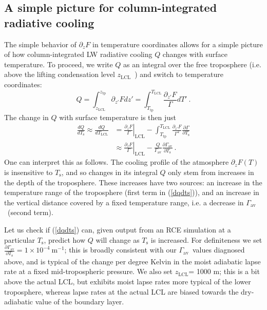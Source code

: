 \documentclass[10pt]{article}
\newcommand{\beqn}{\begin{equation}}
\newcommand{\eeqn}{\end{equation}}
\newcommand{\eqnref}[1]{(\ref{#1})}
\newcommand{\n}{\nonumber}
\newcommand{\inverse}{^{-1}}
\newcommand{\partialderf}[2]{\ensuremath{\frac{\partial #1}{\partial #2}}}
\newcommand{\der}[2]{\ensuremath{\frac{d #1}{d #2}}}
\newcommand{\ppz}{\ensuremath{\partial_z}}
\newcommand{\Ts}{\ensuremath{T_\mathrm{s}}}
\newcommand{\ztp}{\ensuremath{z_\mathrm{tp}}}
\newcommand{\zlcl}{\ensuremath{z_\mathrm{LCL}}}
\newcommand{\Tlcl}{\ensuremath{T_\mathrm{LCL}}}
\newcommand{\Ttp}{\ensuremath{T_\mathrm{tp}}}
\newcommand{\gammaav}{\ensuremath{\Gamma_\mathrm{av}}}
\newcommand{\Kinverse}{\ensuremath{\mathrm{K^{-1}}}}
\begin{document}
	\subsection{A simple picture for column-integrated radiative cooling}
		The simple behavior of $\ppz F$ in temperature coordinates allows for a simple picture of how column-integrated LW radiative cooling $Q$ changes with surface temperature. 
To proceed, we write $Q$ as an integral over the free troposphere (i.e. above the lifting condensation level \zlcl\ ) and switch to temperature coordinates: 
	\beqn
		Q = \int_{\zlcl}^{\ztp} \partial_{z'} F dz'  = \int_{\Ttp}^{\Tlcl} \frac{\partial_{z'} F}{\Gamma} dT' \ . 
		\n
	\eeqn
  The change in $Q$ with surface temperature is then just
	\begin{align}
		\der{Q}{\Ts} \approx \der{Q}{\Tlcl} & =  \left. \frac{\ppz F}{\Gamma}\right |_{\mathrm{LCL}} - \int_{\Ttp}^{\Tlcl}\frac{\partial_{z'} F}{\Gamma^2}\partialderf{\Gamma}{\Ts} \n  \\
				& \approx \left. \frac{\ppz F}{\Gamma}\right |_{\mathrm{LCL}} - \frac{Q}{\gammaav}\partialderf{\gammaav}{\Ts} \ . \label{dqdts}
	\end{align}
One can interpret this as follows. The cooling profile of the atmosphere $\ppz F(T)$ is insensitive to $\Ts$, and so changes in its integral $Q$ only stem from increases in the depth of the troposphere. These increases have two sources: an increase in the temperature range of the troposphere (first term in \eqnref{dqdts}), and an increase in the vertical distance covered by a fixed temperature range, i.e. a decrease in \gammaav\ (second term).

Let us check if \eqnref{dqdts} can, given output from an RCE simulation at a particular \Ts, predict how $Q$ will change as $\Ts$ is increased. 
For definiteness we set $\partialderf{\gammaav}{\Ts}= 1\times 10^{-4} \ \mathrm{m\inverse}$; this is broadly consistent with our \gammaav\ values diagnosed above, and is  typical of the change per degree Kelvin in the moist adiabatic lapse rate at a fixed mid-tropospheric pressure. We also set \zlcl = 1000 m; this is a bit above the actual LCL, but exhibits moist lapse rates more typical of the lower troposphere, whereas lapse rates at the actual LCL are biased towards the dry-adiabatic value of the boundary layer. 
\end{document}
